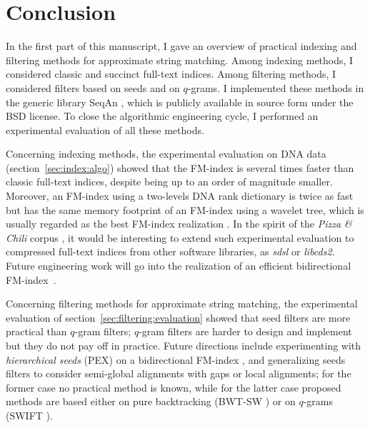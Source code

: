 \chapter{Conclusion}

In the first part of this manuscript, I gave an overview of practical indexing and filtering methods for approximate string matching.
Among indexing methods, I considered classic and succinct full-text indices.
Among filtering methods, I considered filters based on seeds and on $q$-grams.
I implemented these methods in the generic \CC library SeqAn \citep{Doering2008}, which is publicly available in source form under the BSD license.
To close the algorithmic engineering cycle, I performed an experimental evaluation of all these methods.

Concerning indexing methods, the experimental evaluation on DNA data (section~\ref{sec:index:algo}) showed that the FM-index is several times faster than classic full-text indices, despite being up to an order of magnitude smaller.
Moreover, an FM-index using a two-levels DNA rank dictionary is twice as fast but has the same memory footprint of an FM-index using a wavelet tree, which is usually regarded as the best FM-index realization \citep{Navarro2007}.
In the spirit of the \emph{Pizza \& Chili} corpus \citep{Ferragina2007a}, it would be interesting to extend such experimental evaluation to compressed full-text indices from other software libraries, as \emph{sdsl} \citep{Gog2014} or \emph{libcds2}.
Future engineering work will go into the realization of an efficient bidirectional FM-index~\citep{Lam2009, Schnattinger2010}.

Concerning filtering methods for approximate string matching, the experimental evaluation of section~\ref{sec:filtering:evaluation} showed that seed filters are more practical than $q$-gram filters; $q$-gram filters are harder to design and implement but they do not pay off in practice.
Future directions include experimenting with \emph{hierarchical seeds} (PEX) \citep{Navarro2001b} on a bidirectional FM-index \citep{Russo2009}, and generalizing seeds filters to consider semi-global alignments with gaps or local alignments; for the former case no practical method is known, while for the latter case proposed methods are based either on pure backtracking (BWT-SW \citep{Lam2008}) or on $q$-grams (SWIFT \citep{Rasmussen2006}).

